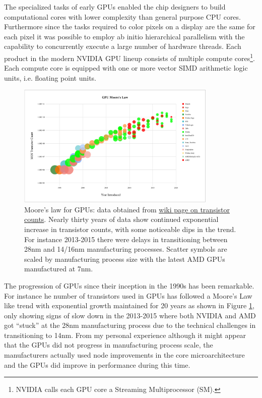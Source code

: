 The specialized tasks of early GPUs enabled the chip designers to build computational cores with lower complexity than general purpose CPU cores. Furthermore since the tasks required to color pixels on a display are the same for each pixel it was possible to employ ab initio hierarchical parallelism with the capability to concurrently execute a large number of hardware threads. Each product in the modern NVIDIA GPU lineup consists of multiple compute cores\footnote{NVIDIA calls each GPU core a Streaming Multiprocessor (SM).}. Each compute core is equipped with one or more vector SIMD arithmetic logic units, i.e. floating point units.

\begin{figure}[htbp!]
    \centering
    \includegraphics[width=0.85\textwidth]{figures/L24/GPUMooresLaw-crop.pdf}
    \caption{Moore's law for GPUs: data obtained from \href{https://en.wikipedia.org/wiki/Transistor_count}{wiki page on transistor counts}. Nearly thirty years of data show continued exponential increase in transistor counts, with some noticeable dips in the trend. For instance 2013-2015 there were delays in transitioning between 28nm and 14/16nm manufacturing processes. Scatter symbols are scaled by manufacturing process size with the latest AMD GPUs manufactured at 7nm.}
    \label{GPUMooresLaw.fig}
\end{figure}

The progression of GPUs since their inception in the 1990s has been remarkable. For instance he number of transistors used in GPUs has followed a Moore's Law like trend with exponential growth maintained for 20 years as shown in Figure \ref{GPUMooresLaw.fig}, only showing signs of slow down in the 2013-2015 where both NVIDIA and AMD got ``stuck'' at the 28nm manufacturing process due to the technical challenges in transitioning to 14nm. From my personal experience although it might appear that the GPUs did not progress in manufacturing process scale, the manufacturers actually used node improvements in the core microarchitecture and the GPUs did improve in performance during this time. 

